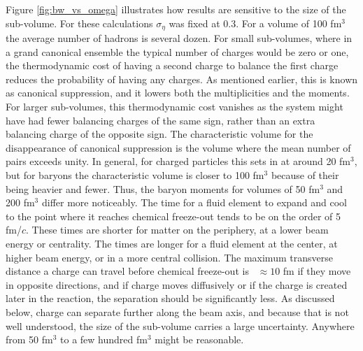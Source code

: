 Figure \ref{fig:bw_vs_omega} illustrates how results are sensitive to the size of the sub-volume. For these calculations $\sigma_\eta$ was fixed at 0.3. For a volume of 100 fm$^3$ the average number of hadrons is several dozen. For small sub-volumes, where in a grand canonical ensemble the typical number of charges would be zero or one, the thermodynamic cost of having a second charge to balance the first charge reduces the probability of having any charges. As mentioned earlier, this is known as canonical suppression, and it lowers both the multiplicities and the moments. For larger sub-volumes, this thermodynamic cost vanishes as the system might have had fewer balancing charges of the same sign, rather than an extra balancing charge of the opposite sign. The characteristic volume for the disappearance of canonical suppression is the volume where the mean number of pairs exceeds unity. In general, for charged particles this sets in at around 20 fm$^3$, but for baryons the characteristic volume is closer to 100 fm$^3$ because of their being heavier and fewer. Thus, the baryon moments for volumes of 50 fm$^3$ and 200 fm$^3$ differ more noticeably. The time for a fluid element to expand and cool to the point where it reaches chemical freeze-out tends to be on the order of 5 fm/$c$. These times are shorter for matter on the periphery, at a lower beam energy or centrality. The times are longer for a fluid element at the center, at higher beam energy, or in a more central collision. The maximum transverse distance a charge can travel before chemical freeze-out is ~$\approx 10$ fm if they move in opposite directions, and if charge moves diffusively or if the charge is created later in the reaction, the separation should be significantly less. As discussed below, charge can separate further along the beam axis, and because that is not well understood, the size of the sub-volume carries a large uncertainty. Anywhere from 50 fm$^3$ to a few hundred fm$^3$ might be reasonable. 


